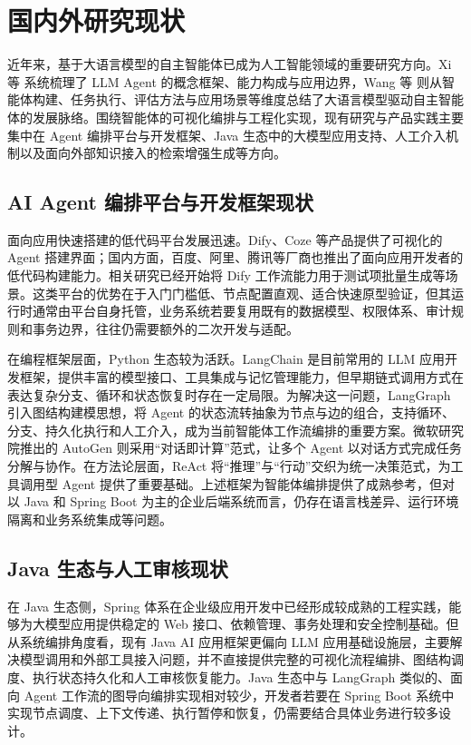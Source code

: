 \section{国内外研究现状}

近年来，基于大语言模型的自主智能体已成为人工智能领域的重要研究方向。Xi 等 系统梳理了 LLM Agent 的概念框架、能力构成与应用边界，Wang 等 则从智能体构建、任务执行、评估方法与应用场景等维度总结了大语言模型驱动自主智能体的发展脉络。围绕智能体的可视化编排与工程化实现，现有研究与产品实践主要集中在 Agent 编排平台与开发框架、Java 生态中的大模型应用支持、人工介入机制以及面向外部知识接入的检索增强生成等方向。

\subsection{AI Agent 编排平台与开发框架现状}

面向应用快速搭建的低代码平台发展迅速。Dify、Coze 等产品提供了可视化的 Agent 搭建界面；国内方面，百度、阿里、腾讯等厂商也推出了面向应用开发者的低代码构建能力。相关研究已经开始将 Dify 工作流能力用于测试项批量生成等场景。这类平台的优势在于入门门槛低、节点配置直观、适合快速原型验证，但其运行时通常由平台自身托管，业务系统若要复用既有的数据模型、权限体系、审计规则和事务边界，往往仍需要额外的二次开发与适配。

在编程框架层面，Python 生态较为活跃。LangChain 是目前常用的 LLM 应用开发框架，提供丰富的模型接口、工具集成与记忆管理能力，但早期链式调用方式在表达复杂分支、循环和状态恢复时存在一定局限。为解决这一问题，LangGraph 引入图结构建模思想，将 Agent 的状态流转抽象为节点与边的组合，支持循环、分支、持久化执行和人工介入，成为当前智能体工作流编排的重要方案。微软研究院推出的 AutoGen 则采用“对话即计算”范式，让多个 Agent 以对话方式完成任务分解与协作。在方法论层面，ReAct 将“推理”与“行动”交织为统一决策范式，为工具调用型 Agent 提供了重要基础。上述框架为智能体编排提供了成熟参考，但对以 Java 和 Spring Boot 为主的企业后端系统而言，仍存在语言栈差异、运行环境隔离和业务系统集成等问题。

\subsection{Java 生态与人工审核现状}

在 Java 生态侧，Spring 体系在企业级应用开发中已经形成较成熟的工程实践，能够为大模型应用提供稳定的 Web 接口、依赖管理、事务处理和安全控制基础。但从系统编排角度看，现有 Java AI 应用框架更偏向 LLM 应用基础设施层，主要解决模型调用和外部工具接入问题，并不直接提供完整的可视化流程编排、图结构调度、执行状态持久化和人工审核恢复能力。Java 生态中与 LangGraph 类似的、面向 Agent 工作流的图导向编排实现相对较少，开发者若要在 Spring Boot 系统中实现节点调度、上下文传递、执行暂停和恢复，仍需要结合具体业务进行较多设计。

